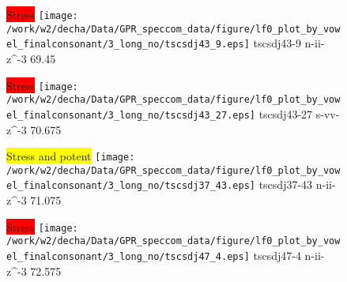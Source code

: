\documentclass{article}
\begin{document}
\begin{figure}[t]
\begin{minipage}[b]{.24\textwidth}
\colorbox{red}{Stress}
\centering
\texttt{[image: /work/w2/decha/Data/GPR\_speccom\_data/figure/lf0\_plot\_by\_vowel\_finalconsonant/3\_long\_no/tscsdj43\_9.eps]}
tscsdj43-9 n-ii-z\textasciicircum-3 69.45
\end{minipage}
\begin{minipage}[b]{.24\textwidth}
\colorbox{red}{Stress}
\centering
\texttt{[image: /work/w2/decha/Data/GPR\_speccom\_data/figure/lf0\_plot\_by\_vowel\_finalconsonant/3\_long\_no/tscsdj43\_27.eps]}
tscsdj43-27 s-vv-z\textasciicircum-3 70.675
\end{minipage}
\begin{minipage}[b]{.24\textwidth}
\colorbox{yellow}{Stress and potent}
\centering
\texttt{[image: /work/w2/decha/Data/GPR\_speccom\_data/figure/lf0\_plot\_by\_vowel\_finalconsonant/3\_long\_no/tscsdj37\_43.eps]}
tscsdj37-43 n-ii-z\textasciicircum-3 71.075
\end{minipage}
\begin{minipage}[b]{.24\textwidth}
\colorbox{red}{Stress}
\centering
\texttt{[image: /work/w2/decha/Data/GPR\_speccom\_data/figure/lf0\_plot\_by\_vowel\_finalconsonant/3\_long\_no/tscsdj47\_4.eps]}
tscsdj47-4 n-ii-z\textasciicircum-3 72.575
\end{minipage}
\end{figure}
\end{document}
